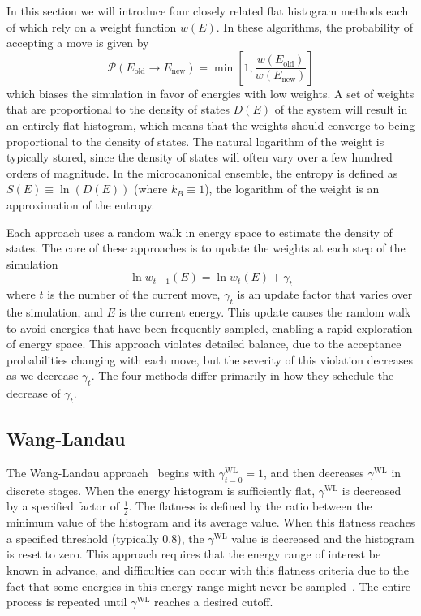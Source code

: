 \documentclass[letterpaper,twocolumn,amsmath,amssymb,pre,aps,10pt]{revtex4-1}
\begin{document}
In this section we will introduce four closely related flat histogram
methods each of which rely on a weight function $w(E)$.  In these
algorithms, the probability of accepting a move is given by
\begin{equation}
	\mathcal{P}(E_\text{old} \rightarrow E_\text{new})
	= \min\left[1,\frac{w(E_\text{old})}{w(E_\text{new})}\right]
\end{equation}
which biases the simulation in favor of energies with low weights.  A set of
weights that are proportional to the density of states $D(E)$ of the system will
result in an entirely flat histogram, which means that the weights should
converge to being proportional to the density of states.  The natural logarithm
of the weight is typically stored, since the density of states will often vary
over a few hundred orders of magnitude. In the microcanonical ensemble, the
entropy is defined as $S(E) \equiv \ln(D(E))$ (where $k_B \equiv 1$), the
logarithm of the weight is an approximation of the entropy.

Each approach uses a random walk in energy space to estimate the density of
states.  The core of these approaches is to update the weights at each step of
the simulation
\begin{equation}
	\ln{w_{t+1}(E)}=\ln{w_{t}(E)}
	+\gamma_t
\end{equation}
where $t$ is the number of the current move, $\gamma_t$ is an update factor
that varies over the simulation, and $E$ is the current energy.  This update
causes the random walk to avoid energies that have been frequently sampled,
enabling a rapid exploration of energy space. This approach violates detailed
balance, due to the acceptance probabilities changing with each move, but the
severity of this violation decreases as we decrease $\gamma_t$.  The four
methods differ primarily in how they schedule the decrease of $\gamma_t$.

\subsection{Wang-Landau}

The Wang-Landau approach~\cite{wang2001efficient,wang2001determining,
landau2014guide} begins with $\gamma^{\text{WL}}_{t=0}=1$, and then decreases
$\gamma^{\text{WL}}$ in discrete stages.  When the energy histogram is
sufficiently flat, $\gamma^{\text{WL}}$ is decreased by a specified factor of
$\frac12$.  The flatness is defined by the ratio between the minimum value of
the histogram and its average value.  When this flatness reaches a specified
threshold (typically 0.8), the $\gamma^{\text{WL}}$ value is decreased and the
histogram is reset to zero.  This approach requires that the energy range of
interest be known in advance, and difficulties can occur with this flatness
criteria due to the fact that some energies in this energy range might never be
sampled~\cite{troster2005wang}.  The entire process is repeated until
$\gamma^{\text{WL}}$ reaches a desired cutoff.
\end{document}
